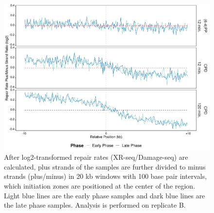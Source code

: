 \begin{figure}[H]
\begin{center}
\includegraphics[width=\textwidth]{Chapters/7_appendix/figures/supfig43}
\caption[Repair rate plus/minus ratio of initiation zones in 20 kb (replicate B).]{After log2-transformed repair rates (XR-seq/Damage-seq) are calculated, plus strands of the samples are further divided to minus strands (plus/minus) in 20 kb windows with 100 base pair intervals, which initiation zones are positioned at the center of the region. Light blue lines are the early phase samples and dark blue lines are the late phase samples. Analysis is performed on replicate B.}
\label{supfig:rrpm20inzonesB}
\end{center}
\end{figure}

